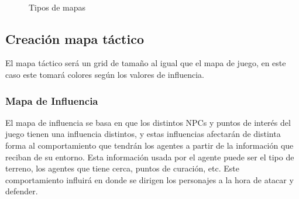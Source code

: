 \begin{figure}[H]
    \centering
    \quad
     \\
    \quad
    \caption{Tipos de mapas}
\end{figure}

\subsection{Creación mapa táctico}

El mapa táctico será un grid de tamaño  al igual que el mapa de juego, en este caso este tomará colores según los valores de influencia.

\subsubsection{Mapa de Influencia}

El mapa de influencia se basa en que los distintos NPCs y puntos de interés del juego tienen una influencia distintos, y estas influencias afectarán de distinta forma al comportamiento que tendrán los agentes a partir de la información que reciban de su entorno. Esta información usada por el agente puede ser el tipo de terreno, los agentes que tiene cerca, puntos de curación, etc. Este comportamiento influirá en donde se dirigen los personajes a la hora de atacar y defender. 

